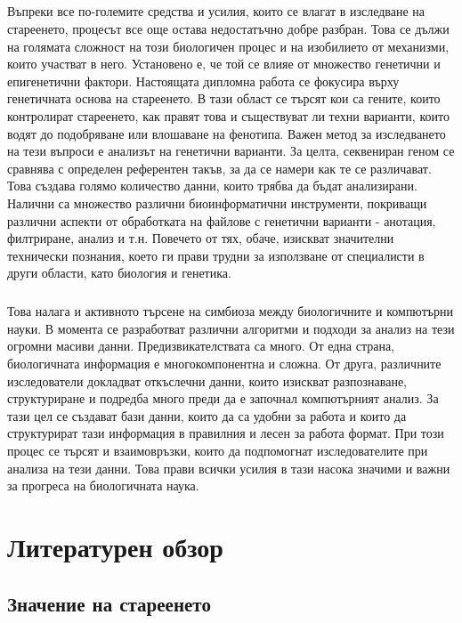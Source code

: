 \documentclass[pdftex,cyrillic,14pt,a4page,twoside,openright]{extreport}
\begin{document}
\paragraph{}
Въпреки все по-големите средства и усилия, които се влагат в изследване на стареенето, процесът все още остава недостатъчно добре разбран. Това се дължи на голямата сложност на този биологичен процес и на изобилието от механизми, които участват в него. Установено е, че той се влияе от множество генетични и епигенетични фактори.
Настоящата дипломна работа се фокусира върху генетичната основа на стареенето. В тази област се търсят кои са гените, които контролират стареенето, как правят това и съществуват ли техни варианти, които водят до подобряване или влошаване на фенотипа. Важен метод за изследването на тези въпроси е анализът на генетични варианти. За целта, секвениран геном се сравнява с определен референтен такъв, за да се намери как те се различават. Това създава голямо количество данни, които трябва да бъдат анализирани. Налични са множество различни биоинформатични инструменти, покриващи различни аспекти от обработката на файлове с генетични варианти - анотация, филтриране, анализ и т.н. Повечето от тях, обаче, изискват значителни технически познания, което ги прави трудни за използване от специалисти в други области, като биология и генетика.

\paragraph{}
Това налага и  активното търсене на симбиоза между биологичните и компютърни науки. В момента се разработват различни алгоритми и подходи за анализ на тези огромни масиви данни. Предизвикателствата са много. От една страна, биологичната информация е многокомпонентна и сложна. От друга, различните изследователи  докладват откъслечни данни, които изискват разпознаване, структуриране и  подредба много преди да е започнал компютърният анализ. За тази цел се създават бази данни, които да са удобни за работа и които да структурират тази информация в правилния и лесен за работа формат. При този процес се търсят и взаимовръзки, които да подпомогнат изследователите при анализа на тези данни. Това прави всички усилия в тази насока значими и важни за прогреса на биологичната наука.
            
\chapter{Литературен обзор}
\section{Значение на стареенето}
\end{document}
